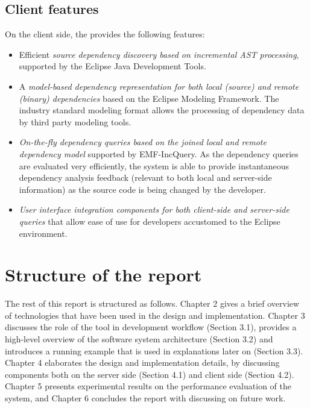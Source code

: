 \subsection{Client features}
On the client side, the \ptool{} provides the following features:
\begin{itemize}
  \item Efficient \emph{source dependency discovery based on incremental AST
  processing}, supported by the Eclipse Java Development Tools.
  \item A \emph{model-based dependency representation for both local (source)
  and remote (binary) dependencies} based on the Eclipse Modeling Framework. The
  industry standard modeling format allows the processing of dependency data by
  third party modeling tools.
  \item \emph{On-the-fly dependency queries based on the joined local and remote
  dependency model} supported by EMF-IncQuery. As the dependency queries are
  evaluated very efficiently, the system is able to provide instantaneous
  dependency analysis feedback (relevant to both local and server-side
  information) as the source code is being changed by the developer.
  \item \emph{User interface integration components for both client-side and
  server-side queries} that allow ease of use for developers accustomed to the
  Eclipse environment.
\end{itemize}

\section{Structure of the report}
The rest of this report is structured as follows. Chapter 2 gives a brief
overview of technologies that have been used in the design and implementation.
Chapter 3 discusses the role of the tool in development workflow (Section 3.1),
provides a high-level overview of the software system architecture (Section 3.2)
and introduces a running example that is used in explanations later on (Section
3.3). Chapter 4 elaborates the design and implementation details, by discussing
components both on the server side (Section 4.1) and client side (Section 4.2).
Chapter 5 presents experimental results on the performance evaluation of the
system, and Chapter 6 concludes the report with discussing on future work.



